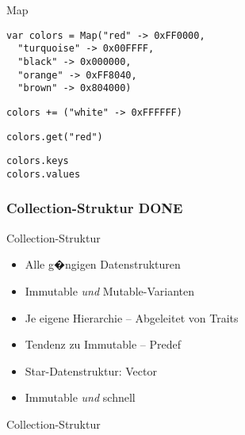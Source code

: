 \documentclass[14pt,aspectratio=169,trans]{beamer} %
\begin{document}
\begin{frame}[fragile]{}
 \begin{block}{Map}
\scriptsize
	\onslide<2->
  \begin{lstlisting}
var colors = Map("red" -> 0xFF0000,
  "turquoise" -> 0x00FFFF,
  "black" -> 0x000000,
  "orange" -> 0xFF8040,
  "brown" -> 0x804000)
	\end{lstlisting}
  \begin{lstlisting}[firstnumber = 6]
colors += ("white" -> 0xFFFFFF)
\end{lstlisting}
  \begin{lstlisting}[firstnumber = 7]
colors.get("red")
\end{lstlisting}
  \begin{lstlisting}[firstnumber = 8]
colors.keys
colors.values
\end{lstlisting}
\end{block}
\note{
}
\end{frame}

\subsubsection*{Collection-Struktur DONE} 

\begin{frame}{}
	\begin{block}{Collection-Struktur}
		\begin{itemize}
			\item<2->Alle g�ngigen Datenstrukturen
			\item<3->Immutable \emph{und} Mutable-Varianten
			\item<4->Je eigene Hierarchie -- Abgeleitet von Traits
			\item<5->Tendenz zu Immutable -- Predef
			\item<6->Star-Datenstruktur: Vector
			\item<7->Immutable \emph{und} schnell
		\end{itemize}
	\end{block}
	\note{}
\end{frame}

\begin{frame}[plain]
\begin{block}{Collection-Struktur}
   \begin{centering} 
     \par
   \end{centering}
	\end{block}
\end{frame} 
\end{document}
